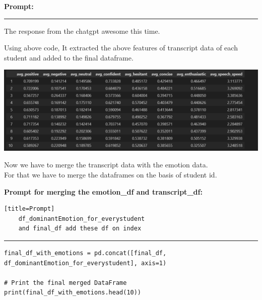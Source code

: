 \documentclass[11pt,a4paper]{article}
\begin{document}
\textbf{Prompt:}
\begin{tcolorbox}[title='Prompt']
    
\end{tcolorbox}
\begin{center}
    \color{red}\rule{1\linewidth}{0.5mm}
\end{center}

\begin{responsebox}
    The response from the chatgpt awesome this time.
\end{responsebox}

\begin{tcolorbox}
    
\end{tcolorbox}

\large{Using above code, It extracted the above features of transcript data of each student and added to the final dataframe.}
\begin{center}
    \includegraphics[width=1\columnwidth]{images_prompts/trans_df.png}
\end{center}

\begin{tcolorbox}[colback=yellow!10!white, colframe=red!80!black, title=Note]
  Now we have to merge the transcript data with the emotion data. \\
  For that we have to merge the dataframes on the basis of student id.
\end{tcolorbox}

\textbf{Prompt for merging the emotion\_df and transcript\_df:}
\begin{verbatim}[title=Prompt]
    df_dominantEmotion_for_everystudent
    and final_df add these df on index
\end{verbatim}
\begin{center}
    \color{red}\rule{1\linewidth}{0.5mm}
\end{center}

\begin{tcolorbox}
\begin{lstlisting}
final_df_with_emotions = pd.concat([final_df, df_dominantEmotion_for_everystudent], axis=1)

# Print the final merged DataFrame
print(final_df_with_emotions.head(10))

\end{lstlisting}
\end{tcolorbox}
\end{document}
